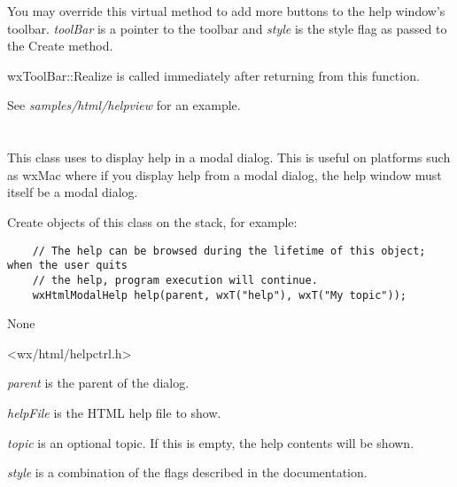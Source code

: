 \label{wxhtmlhelpwindowaddtoolbarbuttons}


You may override this virtual method to add more buttons to the help window's
toolbar. {\it toolBar} is a pointer to the toolbar and {\it style} is the style
flag as passed to the Create method.

wxToolBar::Realize is called immediately after returning from this function.

See {\it samples/html/helpview} for an example.

\section{}\label{wxhtmlmodalhelp}

This class uses  
to display help in a modal dialog. This is useful on platforms such as wxMac
where if you display help from a modal dialog, the help window must itself be a modal
dialog.

Create objects of this class on the stack, for example:

\begin{verbatim}
    // The help can be browsed during the lifetime of this object; when the user quits
    // the help, program execution will continue.
    wxHtmlModalHelp help(parent, wxT("help"), wxT("My topic"));
\end{verbatim}


None


<wx/html/helpctrl.h>




\label{wxhtmlmodalhelpctor}



{\it parent} is the parent of the dialog.

{\it helpFile} is the HTML help file to show.

{\it topic} is an optional topic. If this is empty, the help contents will be shown.

{\it style} is a combination of the flags described in the  documentation.


